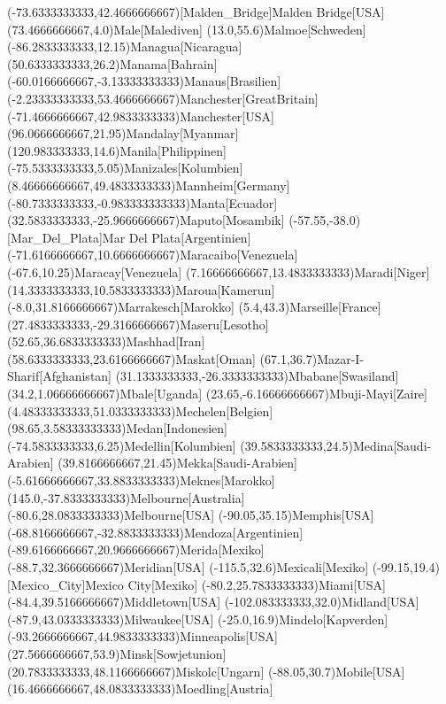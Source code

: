 \mapput(-73.6333333333,42.4666666667)[Malden_Bridge]{Malden Bridge}[USA]
\mapput(73.4666666667,4.0){Male}[Malediven]
\mapput(13.0,55.6){Malmoe}[Schweden]
\mapput(-86.2833333333,12.15){Managua}[Nicaragua]
\mapput(50.6333333333,26.2){Manama}[Bahrain]
\mapput(-60.0166666667,-3.13333333333){Manaus}[Brasilien]
\mapput(-2.23333333333,53.4666666667){Manchester}[GreatBritain]
\mapput(-71.4666666667,42.9833333333){Manchester}[USA]
\mapput(96.0666666667,21.95){Mandalay}[Myanmar]
\mapput(120.983333333,14.6){Manila}[Philippinen]
\mapput(-75.5333333333,5.05){Manizales}[Kolumbien]
\mapput(8.46666666667,49.4833333333){Mannheim}[Germany]
\mapput(-80.7333333333,-0.983333333333){Manta}[Ecuador]
\mapput(32.5833333333,-25.9666666667){Maputo}[Mosambik]
\mapput(-57.55,-38.0)[Mar_Del_Plata]{Mar Del Plata}[Argentinien]
\mapput(-71.6166666667,10.6666666667){Maracaibo}[Venezuela]
\mapput(-67.6,10.25){Maracay}[Venezuela]
\mapput(7.16666666667,13.4833333333){Maradi}[Niger]
\mapput(14.3333333333,10.5833333333){Maroua}[Kamerun]
\mapput(-8.0,31.8166666667){Marrakesch}[Marokko]
\mapput(5.4,43.3){Marseille}[France]
\mapput(27.4833333333,-29.3166666667){Maseru}[Lesotho]
\mapput(52.65,36.6833333333){Mashhad}[Iran]
\mapput(58.6333333333,23.6166666667){Maskat}[Oman]
\mapput(67.1,36.7){Mazar-I-Sharif}[Afghanistan]
\mapput(31.1333333333,-26.3333333333){Mbabane}[Swasiland]
\mapput(34.2,1.06666666667){Mbale}[Uganda]
\mapput(23.65,-6.16666666667){Mbuji-Mayi}[Zaire]
\mapput(4.48333333333,51.0333333333){Mechelen}[Belgien]
\mapput(98.65,3.58333333333){Medan}[Indonesien]
\mapput(-74.5833333333,6.25){Medellin}[Kolumbien]
\mapput(39.5833333333,24.5){Medina}[Saudi-Arabien]
\mapput(39.8166666667,21.45){Mekka}[Saudi-Arabien]
\mapput(-5.61666666667,33.8833333333){Meknes}[Marokko]
\mapput(145.0,-37.8333333333){Melbourne}[Australia]
\mapput(-80.6,28.0833333333){Melbourne}[USA]
\mapput(-90.05,35.15){Memphis}[USA]
\mapput(-68.8166666667,-32.8833333333){Mendoza}[Argentinien]
\mapput(-89.6166666667,20.9666666667){Merida}[Mexiko]
\mapput(-88.7,32.3666666667){Meridian}[USA]
\mapput(-115.5,32.6){Mexicali}[Mexiko]
\mapput(-99.15,19.4)[Mexico_City]{Mexico City}[Mexiko]
\mapput(-80.2,25.7833333333){Miami}[USA]
\mapput(-84.4,39.5166666667){Middletown}[USA]
\mapput(-102.083333333,32.0){Midland}[USA]
\mapput(-87.9,43.0333333333){Milwaukee}[USA]
\mapput(-25.0,16.9){Mindelo}[Kapverden]
\mapput(-93.2666666667,44.9833333333){Minneapolis}[USA]
\mapput(27.5666666667,53.9){Minsk}[Sowjetunion]
\mapput(20.7833333333,48.1166666667){Miskolc}[Ungarn]
\mapput(-88.05,30.7){Mobile}[USA]
\mapput(16.4666666667,48.0833333333){Moedling}[Austria]
